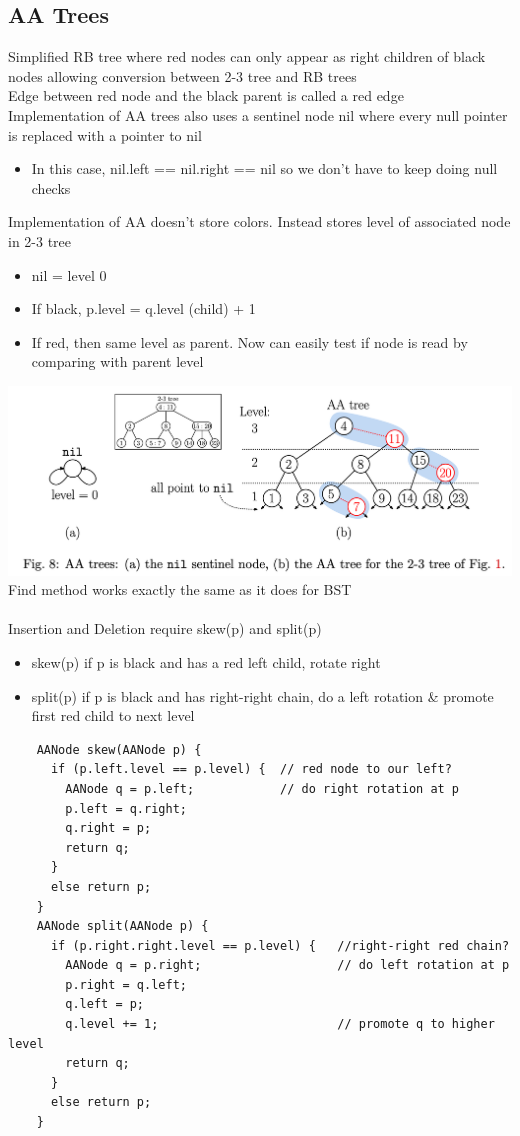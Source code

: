 \documentclass{article}
\begin{document}
  \subsection{AA Trees}
  Simplified RB tree where red nodes can only appear as right children of black nodes allowing conversion between 2-3 tree and RB trees \\
  Edge between red node and the black parent is called a red edge \\
  Implementation of AA trees also uses a sentinel node nil where every null pointer is replaced with a pointer to nil
  \begin{itemize}[noitemsep]
  \item In this case, nil.left == nil.right == nil so we don't have to keep doing null checks
  \end{itemize}
  Implementation of AA doesn't store colors. Instead stores level of associated node in 2-3 tree
  \begin{itemize}[noitemsep]
  \item nil = level 0
  \item If black, p.level = q.level (child) + 1
  \item If red, then same level as parent. Now can easily test if node is read by comparing with parent level
  \end{itemize}
  \includegraphics[width=\textwidth]{AATree}
  Find method works exactly the same as it does for BST \\ \\
  Insertion and Deletion require skew(p) and split(p)
  \begin{itemize}[noitemsep]
  \item skew(p) if p is black and has a red left child, rotate right
  \item split(p) if p is black and has right-right chain, do a left rotation \& promote first red child to next level
  \end{itemize}
  \begin{lstlisting}
    AANode skew(AANode p) {   
      if (p.left.level == p.level) {  // red node to our left?
        AANode q = p.left;            // do right rotation at p
        p.left = q.right;
        q.right = p;
        return q;
      }
      else return p;
    }
    AANode split(AANode p) {
      if (p.right.right.level == p.level) {   //right-right red chain?
        AANode q = p.right;                   // do left rotation at p
        p.right = q.left;
        q.left = p;
        q.level += 1;                         // promote q to higher level
        return q;
      }
      else return p;
    }
  \end{lstlisting}
\end{document}
